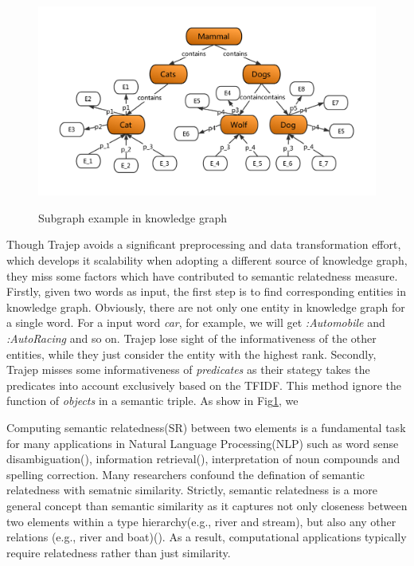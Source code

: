 \begin{figure}
    \centering
    \includegraphics[width=1.0\textwidth]{pic/weak1.pdf}\\
    \caption{Subgraph example in knowledge graph}
    \label{weak1}
\end{figure}


Though Trajep \cite{REWOED} avoids a significant preprocessing and data
transformation effort, which develops it scalability when adopting a
different source of knowledge graph, they miss some factors which 
have contributed to semantic relatedness measure. Firstly, given two words
as input, the first step is to find corresponding entities in knowledge
graph. Obviously, there are not only one entity in knowledge graph for a single
word. For a input word \emph{car}, for example, we will get \emph{:Automobile} and 
\emph{:Auto\underline{\hspace{0.5em}}Racing} and so on. Trajep lose
sight of the informativeness of the other entities, while they just
consider the entity with the highest rank. Secondly, Trajep misses
some informativeness of \emph{predicates} as their stategy takes
the predicates into account exclusively based on the TFIDF. This 
method ignore the function of \emph{objects} in a semantic triple. 
As show in Fig\ref{weak1}, we 

Computing semantic relatedness(SR) between two elements is a fundamental 
task for many applications in Natural Language Processing(NLP) such as 
word sense disambiguation(\cite{}), information retrieval(\cite{}), 
interpretation of noun compounds and spelling correction. Many researchers
confound the defination of semantic relatedness with sematnic similarity.
Strictly, semantic relatedness is a more general concept than semantic 
similarity as it captures not only closeness between two elements within
a type hierarchy(e.g., river and stream), but also any other relations
(e.g., river and boat)(\cite{BudanitskyH06}). As a result, computational
applications typically require relatedness rather than just similarity.

